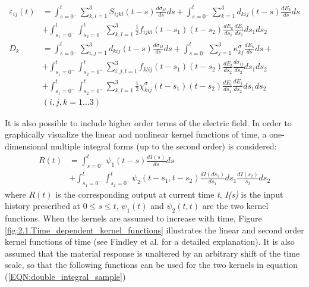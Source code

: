 \begin{equation}
\begin{aligned}
\varepsilon _{ij} (t) &=
\int_{s=0^{-}}^{t} 
\sum_{k,l=1}^3 {S_{ijkl}}(t-s)
\frac{d{\sigma_{kl}}}{ds}ds
+
\int_{s=0^{-}}^{t} 
\sum_{k=1}^3 d_{kij}(t-s)
\frac{d{E_k}}{ds}ds  \\
&+ \int_{s_1=0^{-}}^{t}
\int_{s_2=0^{-}}^{t} 
\sum_{k,l=1}^3 
\frac{1}{2}{f}_{ijkl}(t-s_1)(t-s_2)
\frac{d{E_k}}{ds_1}
\frac{d{E_l}}{ds_2}ds_1 ds_2
\\
{D_k} &=  
\int_{s=0^{-}}^{t} \sum_{i,j=1}^3 {d_{kij}}(t-s)
\frac{d{\sigma_{kl}}}{ds}ds + 
\int_{s=0^{-}}^{t} 
\sum_{j=1}^3 {\kappa^{\sigma}_{kj}}
\frac{d{E_k}}{ds}ds + \\
&+ \int_{s_1=0^{-}}^{t}
\int_{s_2=0^{-}}^{t} 
\sum_{i,j,l=1}^3 {f}_{klij}(t-s_1)(t-s_2) \frac{d{E_l}}{ds_2}\frac{d{ \sigma _{ij} }}{ds_2}ds_1  ds_2
\\
&+ 
\int_{s_1=0^{-}}^{t}
\int_{s_2=0^{-}}^{t} 
\sum_{k,l=1}^3 
\frac{1}{2}\chi^{\sigma}_{kij}(t-s_1)(t-s_2)
\frac{d{E_i}}{ds_1}
\frac{d{E_j}}{ds_2}ds_1 ds_2 \\
& (i,j,k=1 \dots 3)  
\end{aligned}
\label{EQN:double_integral_constitutive_equation}
\end{equation} 
 
It is also possible to include higher order terms of the electric field. 
In order to graphically visualize the linear and nonlinear kernel functions of time,
 a one-dimensional multiple integral forms (up to the second order) is considered:
\begin{equation}
\begin{aligned}
R(t)&=\int_{s=0^{-}}^{t} \psi_1(t-s)\frac{dI(s)}{ds}ds \\
&   +\int_{s_1=0^{-}}^{t}\int_{s_2=0^{-}}^{t}\psi_2(t-s_1,t-s_2) \frac{dI(ds_1)}{ds_1}ds_1 \frac{dI(s_2)}{s_2}ds_2
\end{aligned}
\label{EQN:double_integral_sample}
\end{equation}
where $R(t)$ is the corresponding output at current time \textit{t}, \textit{I(s)} is the input history prescribed at $0\leq s \leq t$, $\psi_1(t)$ and $\psi_2(t,t)$ are the two kernel functions.
When the kernels are assumed to increase with time, 
Figure \ref{fig:2.1.Time_dependent_kernel_functions} illustrates the linear and second order kernel functions of time 
(see Findley et al. \cite{Findley1976} for a detailed explanation). 
It is also assumed that the material response is unaltered by an arbitrary shift of the time scale, so that
 the following functions can be used for the two kernels in equation (\ref{EQN:double_integral_sample})

